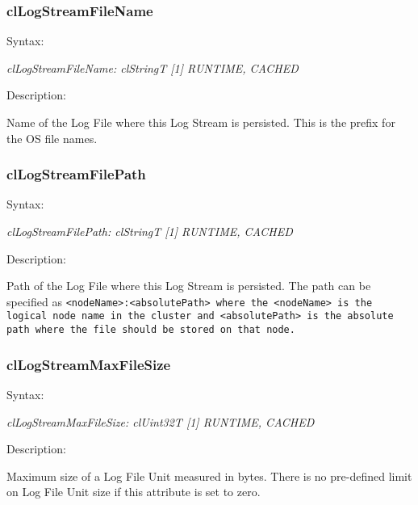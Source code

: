 \begin{flushleft}
\subsubsection{clLogStreamFileName}
\begin{Desc}
\item[Syntax:]
\end{Desc}
\textit{clLogStreamFileName: clStringT [1] {RUNTIME, CACHED}}
\begin{Desc}
\item[Description:]
\end{Desc}
Name of the Log File where this Log Stream is persisted. This is the prefix for the OS file names.


\subsubsection{clLogStreamFilePath}
\begin{Desc}
\item[Syntax:]
\end{Desc}
\textit{clLogStreamFilePath: clStringT [1] {RUNTIME, CACHED}}
\begin{Desc}
\item[Description:]
\end{Desc}
Path of the Log File where this Log Stream is persisted. The path can be specified as
\newline
\tt{<nodeName>:<absolutePath>}
\newline
where the <nodeName> is the logical node name in the cluster and <absolutePath> is the absolute path where the file should be stored on that node.


\subsubsection{clLogStreamMaxFileSize}
\begin{Desc}
\item[Syntax:]
\end{Desc}
\textit{clLogStreamMaxFileSize: clUint32T [1] {RUNTIME, CACHED}}
\begin{Desc}
\item[Description:]
\end{Desc}
Maximum size of a Log File Unit measured in bytes. There is no pre-defined limit on
Log File Unit size if this attribute is set to zero.



\end{flushleft}
